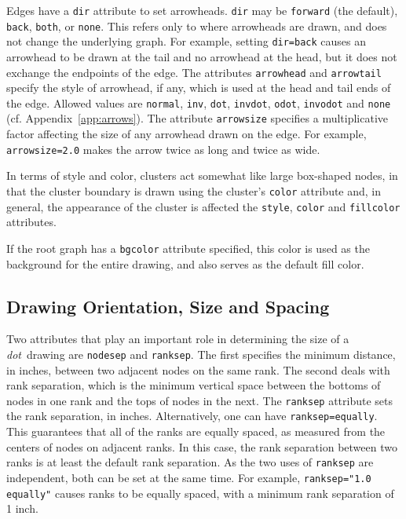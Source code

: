 \documentclass[11pt]{article}
\def\dot{{\it dot}}
\begin{document}
Edges have a \verb"dir" attribute to set arrowheads.
\verb"dir" may be \verb"forward" (the default), \verb"back", \verb"both",
or \verb"none".  This refers only to where arrowheads are drawn, and does
not change the underlying graph.  For example, setting \verb"dir=back"
causes an arrowhead to be drawn at the tail and no arrowhead at the head,
but it does not exchange the endpoints of the edge. The attributes
{\tt arrowhead} and {\tt arrowtail} specify the style of arrowhead,
if any, which is used at the head and tail ends of the edge.
Allowed values are {\tt normal}, {\tt inv}, {\tt dot}, {\tt invdot}, 
{\tt odot}, {\tt invodot} and {\tt none} (cf. Appendix~\ref{app:arrows}).
The attribute {\tt arrowsize} specifies a multiplicative factor affecting
the size of any arrowhead drawn on the edge.
For example, {\tt arrowsize=2.0} makes the arrow twice as long and twice
as wide.

In terms of style and color, clusters act somewhat like large box-shaped
nodes, in that the cluster boundary is drawn using the cluster's
{\tt color} attribute and, in general, the appearance of the 
cluster is affected the {\tt style}, {\tt color} and {\tt fillcolor}
attributes.

If the root graph has a {\tt bgcolor} attribute specified, this color is used
as the background for the entire drawing, and also serves as the default
fill color.

\subsection{Drawing Orientation, Size and Spacing}

Two attributes that play an important role in determining the size of
a \dot\ drawing are {\tt nodesep} and {\tt ranksep}.
The first specifies the minimum distance, in inches, between two 
adjacent nodes on the same rank.
The second deals with rank separation, which is the minimum vertical space
between the bottoms of nodes in one rank and the tops of nodes in the next.
The {\tt ranksep} attribute sets the rank separation, in inches.
Alternatively, one can have {\tt ranksep=equally}. This guarantees
that all of the ranks are equally spaced, as measured from the
centers of nodes on adjacent ranks. In this case, the rank separation
between two ranks is at least the default rank separation. As the
two uses of {\tt ranksep} are independent, both can be set at the
same time. For example, {\tt ranksep="1.0 equally"} causes ranks to
be equally spaced, with a minimum rank separation of 1 inch.
\end{document}
